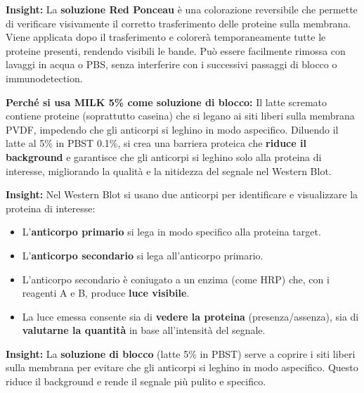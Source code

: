     \begin{insightBox}
	\textbf{Insight:} La \textbf{soluzione Red Ponceau} è una colorazione reversibile che permette di verificare visivamente il corretto trasferimento delle proteine sulla membrana. 
	Viene applicata dopo il trasferimento e colorerà temporaneamente tutte le proteine presenti, rendendo visibili le bande. 
	Può essere facilmente rimossa con lavaggi in acqua o PBS, senza interferire con i successivi passaggi di blocco o immunodetection.
\end{insightBox}

\begin{percheBox}
	\textbf{Perché si usa MILK 5\% come soluzione di blocco:}  
	Il latte scremato contiene proteine (soprattutto caseina) che si legano ai siti liberi sulla membrana PVDF, impedendo che gli anticorpi si leghino in modo aspecifico. 
	Diluendo il latte al 5\% in PBST 0.1\%, si crea una barriera proteica che \textbf{riduce il background} e garantisce che gli anticorpi si leghino solo alla proteina di interesse, migliorando la qualità e la nitidezza del segnale nel Western Blot.
\end{percheBox}

\begin{insightBox}
	\textbf{Insight:} Nel Western Blot si usano due anticorpi per identificare e visualizzare la proteina di interesse:
	\begin{itemize}
		\item L’\textbf{anticorpo primario} si lega in modo specifico alla proteina target.
		\item L’\textbf{anticorpo secondario} si lega all’anticorpo primario.
		\item L’anticorpo secondario è coniugato a un enzima (come HRP) che, con i reagenti A e B, produce \textbf{luce visibile}.
		\item La luce emessa consente sia di \textbf{vedere la proteina} (presenza/assenza), sia di \textbf{valutarne la quantità} in base all’intensità del segnale.
	\end{itemize}
\end{insightBox}

\begin{insightBox}
	\textbf{Insight:} La \textbf{soluzione di blocco} (latte 5\% in PBST) serve a coprire i siti liberi sulla membrana per evitare che gli anticorpi si leghino in modo aspecifico.  
	Questo riduce il background e rende il segnale più pulito e specifico.
\end{insightBox}



